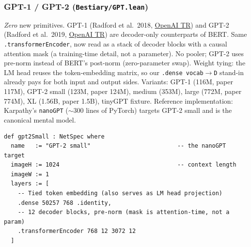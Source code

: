 \subsubsection*{GPT-1 / GPT-2 (\texttt{Bestiary/GPT.lean})}
\emph{Zero} new primitives. GPT-1 (Radford et al.\ 2018,
\href{https://cdn.openai.com/research-covers/language-unsupervised/language_understanding_paper.pdf}{OpenAI TR})
and GPT-2 (Radford et al.\ 2019,
\href{https://cdn.openai.com/better-language-models/language_models_are_unsupervised_multitask_learners.pdf}{OpenAI TR})
are decoder-only counterparts of BERT. Same
\texttt{.transformerEncoder}, now read as a stack of decoder blocks
with a causal attention mask (a training-time detail, not a
parameter). No pooler; GPT-2 uses pre-norm instead of BERT's
post-norm (zero-parameter swap). Weight tying: the LM head reuses
the token-embedding matrix, so our \texttt{.dense vocab$\to$D}
stand-in already pays for both input and output sides. Variants:
GPT-1 (116M, paper 117M), GPT-2 small (123M, paper 124M), medium
(353M), large (772M, paper 774M), XL (1.56B, paper 1.5B), tinyGPT
fixture. Reference implementation: Karpathy's \texttt{nanoGPT}
($\sim$300 lines of PyTorch) targets GPT-2 small and is the
canonical mental model.

\begin{verbatim}
def gpt2Small : NetSpec where
  name   := "GPT-2 small"                         -- the nanoGPT target
  imageH := 1024                                  -- context length
  imageW := 1
  layers := [
    -- Tied token embedding (also serves as LM head projection)
    .dense 50257 768 .identity,
    -- 12 decoder blocks, pre-norm (mask is attention-time, not a param)
    .transformerEncoder 768 12 3072 12
  ]
\end{verbatim}

